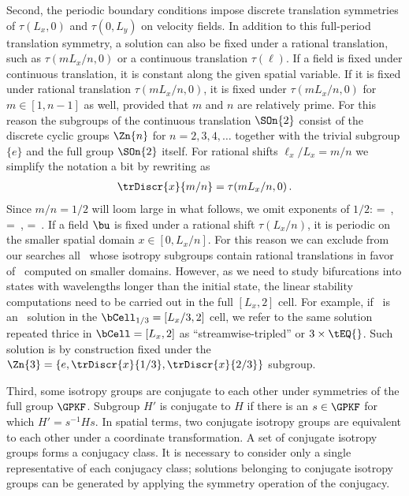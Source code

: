\begin{description}
Second, the periodic boundary conditions impose discrete
translation symmetries of $\tau(L_x, 0)$ and $\tau(0, L_y)$ on
velocity fields. In addition to this full-period translation symmetry,
a solution can also be fixed under a rational translation, such as
$\tau(m L_x/n, 0)$ or a continuous translation $\tau(\ell)$.
If a field is fixed under continuous translation, it is
constant along the given spatial variable. If it is fixed under rational
translation $\tau(m L_x/n, 0)$, it is fixed under $\tau(m L_x/n,
0)$ for $m \in [1, n-1]$ as well, provided that $m$ and $n$ are
relatively prime. For this reason the subgroups of the
continuous translation $\SOn{2}$ consist of the discrete cyclic groups
$\Zn{n}$ for $n=2,3,4,\ldots$ together with the trivial subgroup $\{e\}$
and the full group $\SOn{2}$ itself. For rational
shifts $\ell_x/L_x = m/n$ we simplify the notation a bit by rewriting
 as
\begin{align}
\trDiscr{x}{m/n} = \tau(m L_x/n, 0)
\,.
\label{translDisc}
\end{align}
Since $m/n = 1/2$ will loom large in what follows, we omit exponents of $1/2$:
\beq
     = 
    \,,\;
     = 
    \,,\;
     =  
\,.
\label{tauHalf}
\eeq
If a field $\bu$ is fixed under a rational shift $\tau(L_x/n)$,
it is periodic on the smaller spatial domain $x \in [0,L_x/n]$.
For this reason we can exclude from our searches all \eqv\
whose isotropy subgroups contain
rational translations in favor of \eqva\ computed on smaller domains.
However, as we need to study bifurcations into
states with wavelengths longer than the initial state,
the linear stability computations
need to be carried out in the full $[L_x,2]$ cell.
For example, if \tEQ{}\ is an \eqv\ solution in the
$\bCell_{1/3}= [L_x/3,2]$ cell, we refer to the
same solution repeated thrice in $\bCell = [L_x,2]$
as ``streamwise-tripled'' or
$3 \times \tEQ{}$. Such solution is by construction fixed under the
$\Zn{3} = \{e,\trDiscr{x}{1/3},\trDiscr{x}{2/3}\}$ subgroup.


Third, some isotropy groups are conjugate to each other under symmetries
of the full group $\GPKF$. Subgroup $H'$ is conjugate to $H$ if there is
an $s \in \GPKF$ for which $H' = s^{-1} H s$. In spatial terms, two
conjugate isotropy groups are equivalent to each other under a coordinate
transformation. A set of conjugate isotropy groups forms a conjugacy
class. It is necessary to consider only a single representative of each
conjugacy class; solutions belonging to conjugate isotropy groups can be
generated by applying the symmetry operation of the conjugacy.


\end{description}
